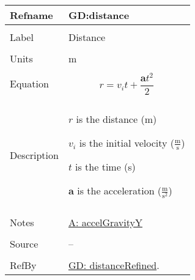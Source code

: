 \documentclass[12pt]{article}
\begin{document}
\noindent \begin{minipage}{\textwidth}
\begin{tabular}{p{} p{}}
\toprule \textbf{Refname} & \textbf{GD:distance}
\label{GD:distance}
\\ \midrule \\
Label & Distance
\\ \midrule \\
Units & m
\\ \midrule \\
Equation & \begin{displaymath}
           r={v_{i}} t+\frac{\mathbf{a} t^{2}}{2}
           \end{displaymath}
\\ \midrule \\
Description & \begin{symbDescription}
              \item{$r$ is the distance (m)}
              \item{${v_{i}}$ is the initial velocity ($\frac{\text{m}}{\text{s}}$)}
              \item{$t$ is the time (s)}
              \item{$\mathbf{a}$ is the acceleration ($\frac{\text{m}}{\text{s}^{2}}$)}
              \end{symbDescription}
\\ \midrule \\
Notes & \hyperref[accelGravityY]{A: accelGravityY}
\\ \midrule \\
Source & --
\\ \midrule \\
RefBy & \hyperref[GD:distanceRefined]{GD: distanceRefined}.
\\ \bottomrule \end{tabular}
\end{minipage}
\par~
\end{document}

